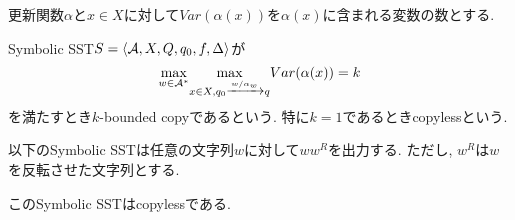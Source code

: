 \documentclass[uplatex,dvipdfmx,a4j]{jsreport}
\begin{document}
  \begin{definition}
    更新関数$\alpha$と$x \in X$に対して$Var(\alpha(x))$を$\alpha(x)$に含まれる変数の数とする.

    Symbolic SST$S = {\langle {\mathcal{A}, X, Q, q_0, f, \Delta} \rangle}$が
    \[
      \underset{w \in \mathcal{A}^*}{\mbox{max}}
        \underset{x \in X, q_0 \xrightarrow[]{w / \alpha_w} q}{\mbox{max}} Var(\alpha(x)) = k
    \]
    を満たすとき$k$-bounded copyであるという. 特に$k = 1$であるときcopylessという.
  \end{definition}

  \begin{example}
    以下のSymbolic SSTは任意の文字列$w$に対して$ww^R$を出力する.
    ただし, $w^R$は$w$を反転させた文字列とする.
    \begin{center}
    \end{center}
    このSymbolic SSTはcopylessである.
  \end{example}
\end{document}
